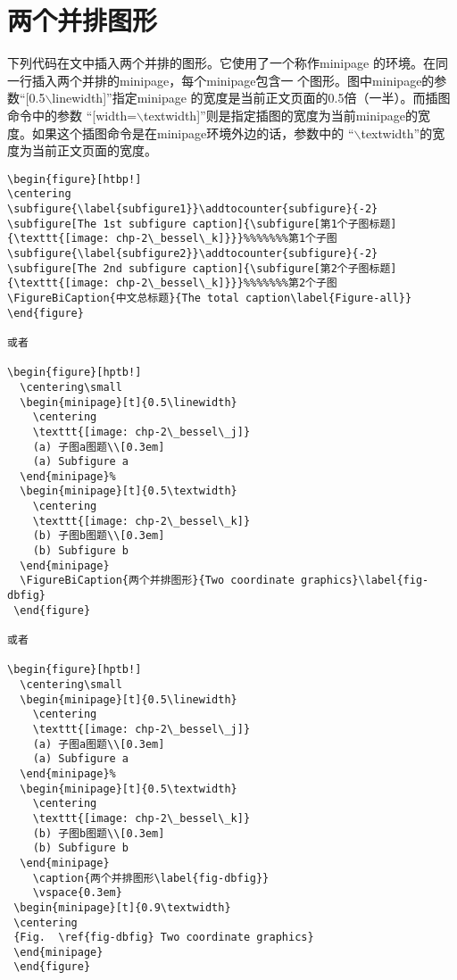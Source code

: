 \section{两个并排图形}\label{section2-2}
下列代码在文中插入两个并排的图形。它使用了一个称作minipage
的环境。在同一行插入两个并排的minipage，每个minipage包含一
个图形。图中minipage的参数“[0.5$\backslash$linewidth]”指定minipage
的宽度是当前正文页面的0.5倍（一半）。而插图命令中的参数
“[width=$\backslash$textwidth]”则是指定插图的宽度为当前minipage的宽
度。如果这个插图命令是在minipage环境外边的话，参数中的
“$\backslash$textwidth”的宽度为当前正文页面的宽度。
\begin{verbatim}
\begin{figure}[htbp!]
\centering
\subfigure{\label{subfigure1}}\addtocounter{subfigure}{-2}
\subfigure[The 1st subfigure caption]{\subfigure[第1个子图标题]
{\texttt{[image: chp-2\_bessel\_k]}}}%%%%%%%第1个子图
\subfigure{\label{subfigure2}}\addtocounter{subfigure}{-2}
\subfigure[The 2nd subfigure caption]{\subfigure[第2个子图标题]
{\texttt{[image: chp-2\_bessel\_k]}}}%%%%%%%第2个子图
\FigureBiCaption{中文总标题}{The total caption\label{Figure-all}}
\end{figure}

或者

\begin{figure}[hptb!]
  \centering\small
  \begin{minipage}[t]{0.5\linewidth}
    \centering
    \texttt{[image: chp-2\_bessel\_j]}
    (a) 子图a图题\\[0.3em]
    (a) Subfigure a
  \end{minipage}%
  \begin{minipage}[t]{0.5\textwidth}
    \centering
    \texttt{[image: chp-2\_bessel\_k]}
    (b) 子图b图题\\[0.3em]
    (b) Subfigure b
  \end{minipage}
  \FigureBiCaption{两个并排图形}{Two coordinate graphics}\label{fig-dbfig}
 \end{figure}

或者

\begin{figure}[hptb!]
  \centering\small
  \begin{minipage}[t]{0.5\linewidth}
    \centering
    \texttt{[image: chp-2\_bessel\_j]}
    (a) 子图a图题\\[0.3em]
    (a) Subfigure a
  \end{minipage}%
  \begin{minipage}[t]{0.5\textwidth}
    \centering
    \texttt{[image: chp-2\_bessel\_k]}
    (b) 子图b图题\\[0.3em]
    (b) Subfigure b
  \end{minipage}
    \caption{两个并排图形\label{fig-dbfig}}
    \vspace{0.3em}
 \begin{minipage}[t]{0.9\textwidth}
 \centering
 {Fig.  \ref{fig-dbfig} Two coordinate graphics}
 \end{minipage}
 \end{figure}
\end{verbatim}
